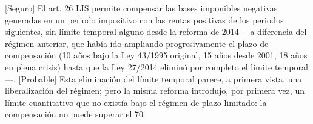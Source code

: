 \documentclass[10pt,a4paper]{article}
\begin{document}
[Seguro] El art. 26 LIS permite compensar las bases imponibles negativas generadas en un periodo impositivo con las rentas positivas de los periodos siguientes, sin límite temporal alguno desde la reforma de 2014 —a diferencia del régimen anterior, que había ido ampliando progresivamente el plazo de compensación (10 años bajo la Ley 43/1995 original, 15 años desde 2001, 18 años en plena crisis) hasta que la Ley 27/2014 eliminó por completo el límite temporal—. [Probable] Esta eliminación del límite temporal parece, a primera vista, una liberalización del régimen; pero la misma reforma introdujo, por primera vez, un límite cuantitativo que no existía bajo el régimen de plazo limitado: la compensación no puede superar el 70%
\end{document}
